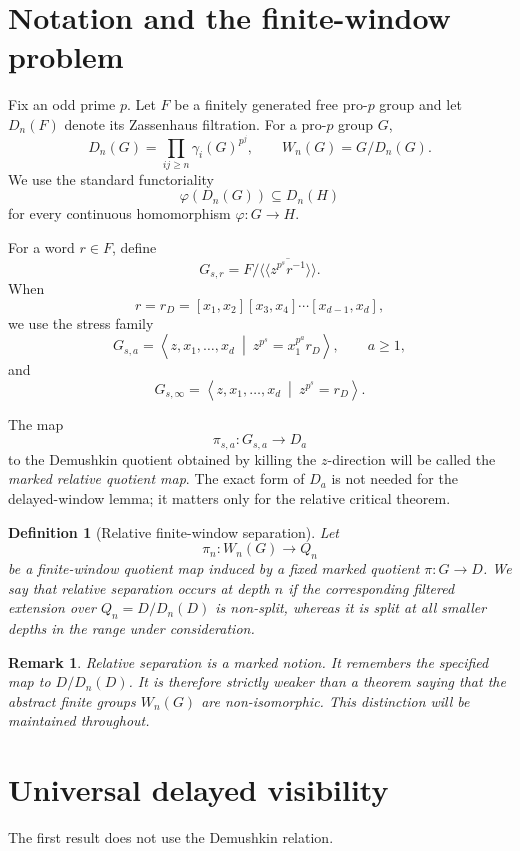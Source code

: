 \documentclass[11pt]{article}
\newtheorem{remark}[theorem]{Remark}
\newtheorem{definition}[theorem]{Definition}
\newcommand{\F}{F}
\newcommand{\Dn}{D_n}
\newcommand{\Wn}{W_n}
\begin{document}
\section{Notation and the finite-window problem}

Fix an odd prime \(p\).  Let \(\F\) be a finitely generated free pro-$p$
group and let \(\Dn(\F)\) denote its Zassenhaus filtration.  For a
pro-$p$ group \(G\),
\[
\Dn(G)=\prod_{ij\ge n}\gamma_i(G)^{p^j},
\qquad
\Wn(G)=G/\Dn(G).
\]
We use the standard functoriality
\[
\varphi(\Dn(G))\subseteq \Dn(H)
\]
for every continuous homomorphism \(\varphi:G\to H\).

For a word \(r\in\F\), define
\[
G_{s,r}=\F/\overline{\langle\!\langle z^{p^s}r^{-1}\rangle\!\rangle}.
\]
When
\[
r=r_D=[x_1,x_2][x_3,x_4]\cdots[x_{d-1},x_d],
\]
we use the stress family
\[
G_{s,a}
=
\left\langle z,x_1,\ldots,x_d
\ \middle|\
z^{p^s}=x_1^{p^a}r_D
\right\rangle ,
\qquad a\ge1,
\]
and
\[
G_{s,\infty}
=
\left\langle z,x_1,\ldots,x_d
\ \middle|\
z^{p^s}=r_D
\right\rangle .
\]

The map
\[
\pi_{s,a}:G_{s,a}\longrightarrow D_a
\]
to the Demushkin quotient obtained by killing the $z$-direction will be
called the \emph{marked relative quotient map}.  The exact form of
\(D_a\) is not needed for the delayed-window lemma; it matters only for
the relative critical theorem.

\begin{definition}[Relative finite-window separation]
Let
\[
\pi_n:\Wn(G)\longrightarrow Q_n
\]
be a finite-window quotient map induced by a fixed marked quotient
\(\pi:G\to D\).  We say that relative separation occurs at depth \(n\)
if the corresponding filtered extension over \(Q_n=D/\Dn(D)\) is
non-split, whereas it is split at all smaller depths in the range under
consideration.
\end{definition}

\begin{remark}
Relative separation is a marked notion.  It remembers the specified
map to \(D/\Dn(D)\).  It is therefore strictly weaker than a theorem
saying that the abstract finite groups \(\Wn(G)\) are non-isomorphic.
This distinction will be maintained throughout.
\end{remark}

\section{Universal delayed visibility}

The first result does not use the Demushkin relation.
\end{document}
